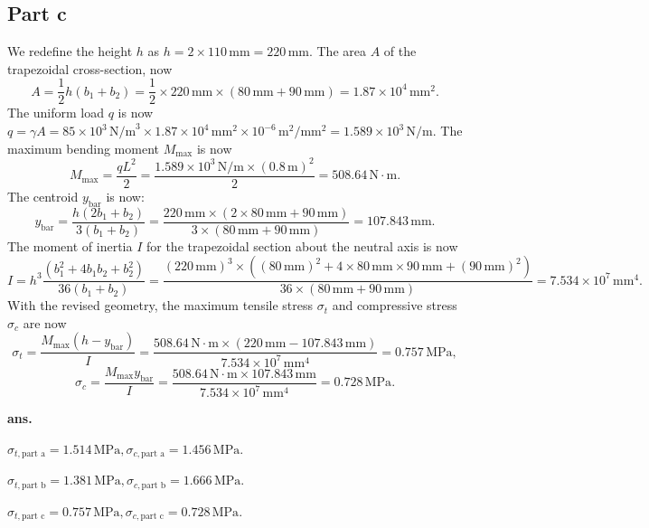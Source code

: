 \documentclass[12pt]{article}
\begin{document}
\subsection*{Part c}
We redefine the height \(h\) as \(h = 2 \times 110 \, \text{mm} = 220 \, \text{mm}\). The area \(A\) of the trapezoidal cross-section, now \[ A = \frac{1}{2} h (b_1 + b_2) = \frac{1}{2} \times 220 \, \text{mm} \times (80 \, \text{mm} + 90 \, \text{mm}) = 1.87 \times 10^4 \, \text{mm}^2. \] The uniform load \(q\) is now \( q = \gamma A = 85 \times 10^3 \, \text{N/m}^3 \times 1.87 \times 10^4 \, \text{mm}^2 \times 10^{-6} \, \text{m}^2/\text{mm}^2 = 1.589 \times 10^3 \, \text{N/m}. \) The maximum bending moment \(M_{\text{max}}\) is now \[ M_{\text{max}} = \frac{q L^2}{2} = \frac{1.589 \times 10^3 \, \text{N/m} \times (0.8 \, \text{m})^2}{2} = 508.64 \, \text{N} \cdot \text{m}. \] The centroid \(y_{\text{bar}}\) is now: \[ y_{\text{bar}} = \frac{h(2b_1 + b_2)}{3(b_1 + b_2)} = \frac{220 \, \text{mm} \times (2 \times 80 \, \text{mm} + 90 \, \text{mm})}{3 \times (80 \, \text{mm} + 90 \, \text{mm})} = 107.843 \, \text{mm}. \] The moment of inertia \(I\) for the trapezoidal section about the neutral axis is now \[ I = h^3 \frac{(b_1^2 + 4b_1b_2 + b_2^2)}{36(b_1 + b_2)} = \frac{(220 \, \text{mm})^3 \times ((80 \, \text{mm})^2 + 4 \times 80 \, \text{mm} \times 90 \, \text{mm} + (90 \, \text{mm})^2)}{36 \times (80 \, \text{mm} + 90 \, \text{mm})} = 7.534 \times 10^7 \, \text{mm}^4. \] With the revised geometry, the maximum tensile stress \( \sigma_t \) and compressive stress \( \sigma_c \) are now \[ \sigma_t = \frac{M_{\text{max}}(h - y_{\text{bar}})}{I} = \frac{508.64 \, \text{N} \cdot \text{m} \times (220 \, \text{mm} - 107.843 \, \text{mm})}{7.534 \times 10^7 \, \text{mm}^4} = 0.757 \, \text{MPa}, \] \[ \sigma_c = \frac{M_{\text{max}} y_{\text{bar}}}{I} = \frac{508.64 \, \text{N} \cdot \text{m} \times 107.843 \, \text{mm}}{7.534 \times 10^7 \, \text{mm}^4} = 0.728 \, \text{MPa}. \]
\AnswerTag



\vfill
\begin{flushright}
\textbf{ans.}

\(\sigma_{t, \text{part a}} = 1.514 \, \text{MPa}, \sigma_{c, \text{part a}} = 1.456 \, \text{MPa}.\)

\(\sigma_{t, \text{part b}} = 1.381 \, \text{MPa}, \sigma_{c, \text{part b}} = 1.666 \, \text{MPa}.\)

\(\sigma_{t, \text{part c}} = 0.757 \, \text{MPa}, \sigma_{c, \text{part c}} = 0.728 \, \text{MPa}.\)


\end{flushright}
\end{document}
